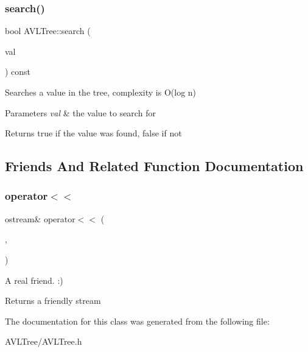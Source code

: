 \subsubsection{\texorpdfstring{search()}{search()}}
{\footnotesize\ttfamily bool A\+V\+L\+Tree\+::search (\begin{DoxyParamCaption}\item[{const int}]{val }\end{DoxyParamCaption}) const}

Searches a value in the tree, complexity is O(log n)


\begin{DoxyParams}{Parameters}
{\em val} & the value to search for \\
\hline
\end{DoxyParams}
\begin{DoxyReturn}{Returns}
true if the value was found, false if not 
\end{DoxyReturn}


\subsection{Friends And Related Function Documentation}
\mbox{\label{classAVLTree_a1c2fe2fa878a3a4e7c2315ac417b2721}} 
\subsubsection{\texorpdfstring{operator$<$$<$}{operator<<}}
{\footnotesize\ttfamily ostream\& operator$<$$<$ (\begin{DoxyParamCaption}\item[{ostream \&}]{,  }\item[{const \mbox{\hyperlink{classAVLTree}{A\+V\+L\+Tree}} \&}]{ }\end{DoxyParamCaption})\hspace{0.3cm}{\ttfamily [friend]}}

A real friend. \+:)

\begin{DoxyReturn}{Returns}
a friendly stream 
\end{DoxyReturn}


The documentation for this class was generated from the following file\+:\begin{DoxyCompactItemize}
\item 
A\+V\+L\+Tree/A\+V\+L\+Tree.\+h\end{DoxyCompactItemize}
